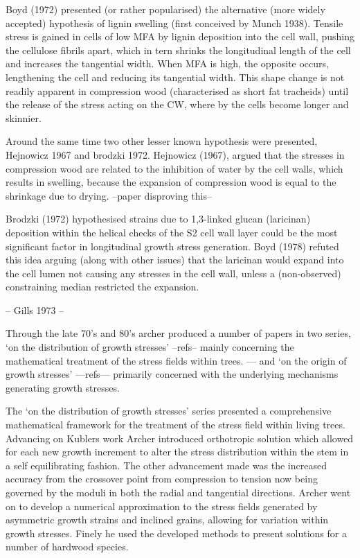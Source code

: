 \documentclass{article}
\begin{document}
Boyd (1972) presented (or rather popularised) the alternative (more widely
accepted) hypothesis of lignin swelling (first conceived by Munch 1938). Tensile
stress is gained in cells of low MFA by lignin deposition into the cell wall,
pushing the cellulose fibrils apart, which in tern shrinks the longitudinal
length of the cell and increases the tangential width. When MFA is high, the
opposite occurs, lengthening the cell and reducing its tangential width. This
shape change is not readily apparent in compression wood (characterised as short fat
tracheids) until the release of the stress acting on the CW, where by the cells
become longer and skinnier.

Around the same time two other lesser known hypothesis were presented, Hejnowicz
1967 and brodzki 1972. Hejnowicz (1967), argued that the stresses in compression
wood are related to the inhibition of water by the cell walls, which results in
swelling, because the expansion of compression wood is equal to the shrinkage
due to drying. --paper disproving this--

Brodzki (1972) hypothesised strains due to 1,3-linked glucan (laricinan)
deposition within the helical checks of the S2 cell wall layer could be the
most significant factor in longitudinal growth stress generation. Boyd (1978)
refuted this idea arguing (along with other issues) that the laricinan would
expand into the cell lumen not causing any stresses in the cell wall, unless a
(non-observed) constraining median restricted the expansion.

-- Gills 1973 --

Through the late 70's and 80's archer produced a number of papers in two series,
`on the distribution of growth stresses' --refs-- mainly concerning the
mathematical treatment of the stress fields within trees. --- and `on the
origin of growth stresses' ---refs--- primarily concerned with the underlying
mechanisms generating growth stresses.

The `on the distribution of growth stresses' series presented a comprehensive
mathematical framework for the treatment of the stress field within living
trees. Advancing on Kublers work Archer introduced orthotropic solution which
allowed for each new growth increment to alter the stress distribution within
the stem in a self equilibrating fashion. The other advancement made was the
increased accuracy from the crossover point from compression to tension now being
governed by the moduli in both the radial and tangential directions.
Archer went on to develop a numerical approximation to the stress fields
generated by asymmetric growth strains and inclined grains, allowing for
variation within growth stresses. Finely he used the developed methods to
present solutions for a number of hardwood species.
\end{document}
